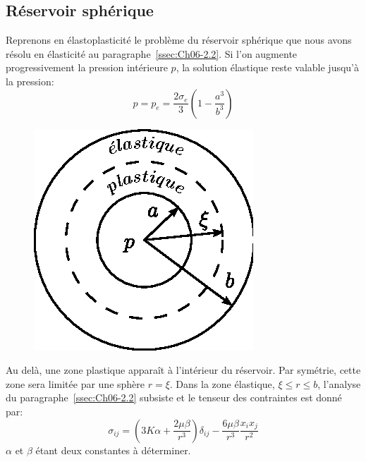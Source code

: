 \subsection{Réservoir sphérique} \label{ssec:Ch10-2.2}
Reprenons en élastoplasticité le problème du réservoir sphérique que nous avons résolu en élasticité au paragraphe~\ref{ssec:Ch06-2.2}.
Si l'on augmente progressivement la pression intérieure $p$, la solution élastique reste valable jusqu'à la pression: 
\begin{equation}
    p = p_e = \frac{2\sigma_e}{3} \left( 1 - \frac{a^3}{b^3} \right)
    \label{eq:Ch10-032}
\end{equation}

    \begin{figure}
        \includegraphics{../images/T1_Ch10-15}
    \end{figure}

Au delà, une zone plastique apparaît à l'intérieur du réservoir. Par symétrie, cette zone sera limitée par une sphère $r=\xi$. Dans la zone élastique, $\xi \leq r \leq b$, l'analyse du paragraphe~\ref{ssec:Ch06-2.2} subsiste et le tenseur des contraintes est donné par: 
\begin{equation}
    \sigma_{ij} = \left( 3 K \alpha + \frac{2\mu \beta}{r^3} \right) \delta_{ij} - \frac{6\mu \beta}{r^3} \frac{x_ix_j}{r^2}
    \label{eq:Ch10-033}
\end{equation}
$\alpha$ et $\beta$ étant deux constantes à déterminer.

